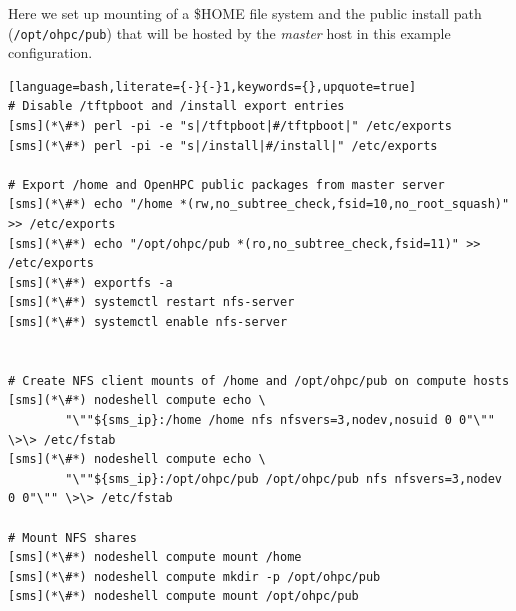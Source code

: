 Here we set up \NFS{}  mounting of a
\$HOME file system and the public \OHPC{} install path (\texttt{/opt/ohpc/pub})
that will be hosted by the {\em master} host in this  example configuration.

\begin{lstlisting}[language=bash,literate={-}{-}1,keywords={},upquote=true]
# Disable /tftpboot and /install export entries
[sms](*\#*) perl -pi -e "s|/tftpboot|#/tftpboot|" /etc/exports
[sms](*\#*) perl -pi -e "s|/install|#/install|" /etc/exports

# Export /home and OpenHPC public packages from master server
[sms](*\#*) echo "/home *(rw,no_subtree_check,fsid=10,no_root_squash)" >> /etc/exports
[sms](*\#*) echo "/opt/ohpc/pub *(ro,no_subtree_check,fsid=11)" >> /etc/exports
[sms](*\#*) exportfs -a
[sms](*\#*) systemctl restart nfs-server
[sms](*\#*) systemctl enable nfs-server


# Create NFS client mounts of /home and /opt/ohpc/pub on compute hosts
[sms](*\#*) nodeshell compute echo \
        "\""${sms_ip}:/home /home nfs nfsvers=3,nodev,nosuid 0 0"\"" \>\> /etc/fstab
[sms](*\#*) nodeshell compute echo \
        "\""${sms_ip}:/opt/ohpc/pub /opt/ohpc/pub nfs nfsvers=3,nodev 0 0"\"" \>\> /etc/fstab

# Mount NFS shares
[sms](*\#*) nodeshell compute mount /home
[sms](*\#*) nodeshell compute mkdir -p /opt/ohpc/pub
[sms](*\#*) nodeshell compute mount /opt/ohpc/pub

\end{lstlisting}

